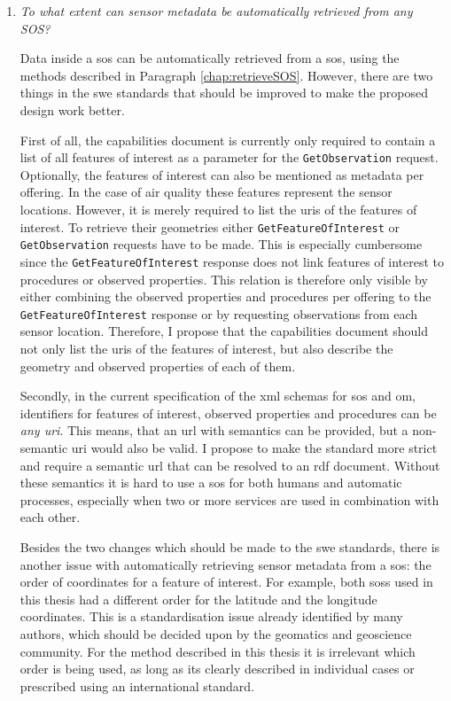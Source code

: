 \begin{enumerate}
\item \textit{To what extent can sensor metadata be automatically retrieved from any SOS?}%

Data inside a \acl{sos} can be automatically retrieved from a \ac{sos}, using the methods described in Paragraph \ref{chap:retrieveSOS}. However, there are two things in the \ac{swe} standards that should be improved to make the proposed design work better. 

\begin{sloppypar}
	First of all, the capabilities document is currently only required to contain a list of all features of interest as a parameter for the \texttt{GetObservation} request. Optionally, the features of interest can also be mentioned as metadata per offering. In the case of air quality these features represent the sensor locations. However, it is merely required to list the \acp{uri} of the features of interest. To retrieve their geometries either \texttt{GetFeatureOfInterest} or \texttt{GetObservation} requests have to be made. This is especially cumbersome since the \texttt{GetFeatureOfInterest} response does not link features of interest to procedures or observed properties. This relation is therefore only visible by either combining the observed properties and procedures per offering to the \texttt{GetFeatureOfInterest} response or by requesting observations from each sensor location. Therefore, I propose that the capabilities document should not only list the \acp{uri} of the features of interest, but also describe the geometry and observed properties of each of them. 
\end{sloppypar}

Secondly, in the current specification of the \ac{xml} schemas for \ac{sos} and \ac{om}, identifiers for features of interest, observed properties and procedures can be \textit{any \ac{uri}}. This means, that an \ac{url} with semantics can be provided, but a non-semantic \ac{uri} would also be valid. I propose to make the standard more strict and require a semantic \ac{url} that can be resolved to an \ac{rdf} document. Without these semantics it is hard to use a \ac{sos} for both humans and automatic processes, especially when two or more services are used in combination with each other. 

Besides the two changes which should be made to the \ac{swe} standards, there is another issue with automatically retrieving sensor metadata from a \ac{sos}: the order of coordinates for a feature of interest. For example, both \aclp{sos} used in this thesis had a different order for the latitude and the longitude coordinates. This is a standardisation issue already identified by many authors, which should be decided upon by the geomatics and geoscience community. For the method described in this thesis it is irrelevant which order is being used, as long as its clearly described in individual cases or prescribed using an international standard.


\end{enumerate}
